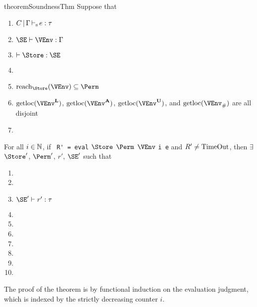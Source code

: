\begin{restatable}{theorem}{SoundnessThm}\label{thm:soundness}
  Suppose that
  \begin{enumerate}[({A}1)]
  \item $C \operatorname{|} \Gamma \operatorname{\vdash_s} e : \tau$
  \item\label{item:32} $\SE \vdash \VEnv : \E$
  \item\label{item:33} $\vdash \Store : \SE$
  \item\label{item:11} \assumeWellformed{}
  \item\label{item:12} $\Reach\Store\VEnv \subseteq \Perm$
  \item $\Rawloc{\Active\VEnv}$,
    $\Rawloc{\MutableBorrows\VEnv}$,
    $\Rawloc{\ImmutableBorrows\VEnv}$, and
    $\Rawloc{\Suspended\VEnv}$ are all disjoint
  \item\label{item:15} \assumeIncoming{}{}
  \end{enumerate}
  For all $i\in\mathbb{N}$, if
  \ \lstinline[style=rule]{R' = eval} $\Store$ $\Perm$ $\VEnv$ \lstinline[style=rule]{i e}
  and $R'\ne \operatorname{TimeOut}$,
  then
  $\exists$ $\Store'$, $\Perm'$, $r'$, $\SE'$ such that
  \begin{enumerate}[({R}1)]
  \item {}
  \item {}
  \item $\SE' \vdash r' : \tau$
  \item {}
  \item {}
  \item {}
  \item {}
  \item {}
  \item {}
  \item {}
  \end{enumerate}
\end{restatable}

The proof of the
theorem is by functional induction on the evaluation judgment, which
is indexed by the strictly decreasing counter $i$.

